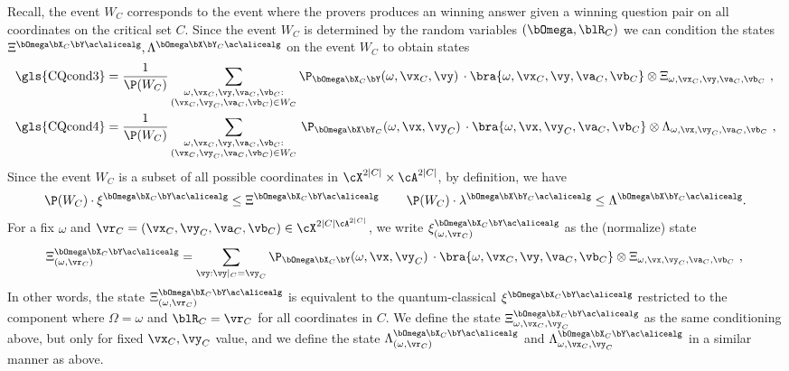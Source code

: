 Recall, the event $W_C$ corresponds to the event where the provers produces an winning answer given a winning question pair on all coordinates on the critical set $C$. Since the event $W_C$ is determined by the random variables $(\bOmega, \blR_C)$ we can condition the states $\Xi^{\bOmega \bX_C \bY \ac \alicealg},  \Lambda^{\bOmega \bX \bY_C  \ac \alicealg}$ on the event $W_C$ to obtain states
\begin{align*}
	\text{\gls{CQcond3}} &= \frac{1}{\P(W_C)} \sum_{\substack{\omega, \vx_C, \vy, \va_C, \vb_C: \\ (\vx_C, \vy_C,\va_C,\vb_C) \in W_C}} \P_{\bOmega \bX_C \bY} (\omega,\vx_C, \vy) \,  \cdot \bra{\omega, \vx_C, \vy, \va_C, \vb_C} \otimes \Xi_{\omega,\vx_C, \vy,\va_C,\vb_C} ~,   \\
	\text{\gls{CQcond4}} &= \frac{1}{\P(W_C)} \sum_{\substack{\omega, \vx_C, \vy, \va_C, \vb_C: \\ (\vx_C, \vy_C,\va_C,\vb_C) \in W_C}}  \, \P_{\bOmega \bX \bY_C} (\omega, \vx, \vy_C) \,\cdot \bra{\omega, \vx, \vy_C, \va_C, \vb_C} \otimes \Lambda_{\omega,\vx,\vy_C, \va_C,\vb_C}~,
\end{align*}
Since the event $W_C$ is a subset of all possible coordinates in $\cX^{2|C|} \times \cA^{2|C|}$, by definition, we have
\begin{equation}
	\P(W_C) \cdot \xi^{\bOmega \bX_C \bY \ac \alicealg}  \leq  \Xi^{\bOmega \bX_C \bY \ac \alicealg} \, \qquad 	\P(W_C) \cdot  \lambda^{\bOmega \bX \bY_C  \ac \alicealg}  \leq \Lambda^{\bOmega \bX \bY_C  \ac \alicealg}. \label{eq:Xitoxiinequality}
\end{equation} 
For a fix $\omega$ and $\vr_C = (\vx_C, \vy_C, \va_C, \vb_C) \in \cX^{2|C| \cA^{2|C|}}$, we write $\xi^{\bOmega \bX_C \bY \ac \alicealg}_{(\omega, \vr_C)}$ as the (normalize) state 
\begin{equation*}
	\Xi^{\bOmega \bX_C \bY \ac \alicealg}_{(\omega, \vr_C)} =  \sum_{\vy: \vy|_{C} = \vy_C} \P_{\bOmega \bX_C \bY} (\omega,\vx, \vy_C) \,  \cdot \bra{\omega, \vx_C, \vy, \va_C, \vb_C} \otimes \Xi_{\omega,\vx, \vy_C,\va_C,\vb_C} ~,  \\
\end{equation*}
In other words, the state $\Xi^{\bOmega \bX_C \bY \ac \alicealg}_{(\omega, \vr_C)}$ is equivalent to the quantum-classical $\xi^{\bOmega \bX_C \bY \ac \alicealg}$ restricted to the component where $\Omega = \omega$ and $\blR_C = \vr_C$ for all coordinates in $C$. We define the state $\Xi^{\bOmega \bX_C \bY \ac \alicealg}_{\omega, \vx_C, \vy_C}$ as the same conditioning above, but only for fixed $\vx_C, \vy_C$ value, and we define the state $\Lambda^{\bOmega \bX_C \bY \ac \alicealg}_{(\omega, \vr_C)}$ and $\Lambda^{\bOmega \bX_C \bY \ac \alicealg}_{\omega, \vx_C, \vy_C}$ in a similar manner as above. 

